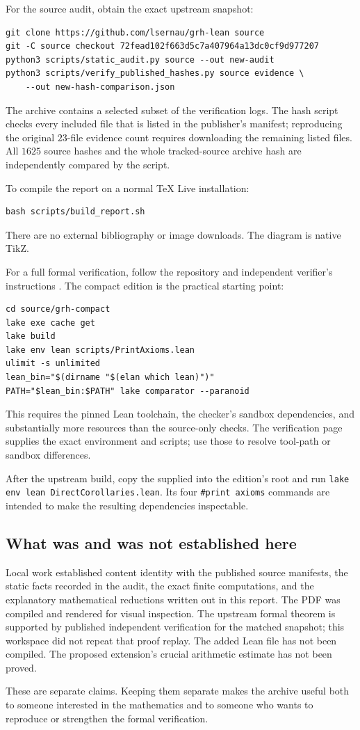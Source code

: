 For the source audit, obtain the exact upstream snapshot:
\begin{verbatim}
git clone https://github.com/lsernau/grh-lean source
git -C source checkout 72fead102f663d5c7a407964a13dc0cf9d977207
python3 scripts/static_audit.py source --out new-audit
python3 scripts/verify_published_hashes.py source evidence \
    --out new-hash-comparison.json
\end{verbatim}
The archive contains a selected subset of the verification logs. The hash script checks every included file that is listed in the publisher's manifest; reproducing the original \(23\)-file evidence count requires downloading the remaining listed files. All \(1625\) source hashes and the whole tracked-source archive hash are independently compared by the script.

To compile the report on a normal TeX Live installation:
\begin{verbatim}
bash scripts/build_report.sh
\end{verbatim}
There are no external bibliography or image downloads. The diagram is native TikZ.

For a full formal verification, follow the repository and independent verifier's instructions \cite{repo,checks}. The compact edition is the practical starting point:
\begin{verbatim}
cd source/grh-compact
lake exe cache get
lake build
lake env lean scripts/PrintAxioms.lean
ulimit -s unlimited
lean_bin="$(dirname "$(elan which lean)")"
PATH="$lean_bin:$PATH" lake comparator --paranoid
\end{verbatim}
This requires the pinned Lean toolchain, the checker's sandbox dependencies, and substantially more resources than the source-only checks. The verification page supplies the exact environment and scripts; use those to resolve tool-path or sandbox differences.

After the upstream build, copy the supplied  into the edition's root and run \texttt{lake env lean DirectCorollaries.lean}. Its four \texttt{\#print axioms} commands are intended to make the resulting dependencies inspectable.

\subsection{What was and was not established here}

Local work established content identity with the published source manifests, the static facts recorded in the audit, the exact finite computations, and the explanatory mathematical reductions written out in this report. The PDF was compiled and rendered for visual inspection. The upstream formal theorem is supported by published independent verification for the matched snapshot; this workspace did not repeat that proof replay. The added Lean file has not been compiled. The proposed extension's crucial arithmetic estimate has not been proved.

These are separate claims. Keeping them separate makes the archive useful both to someone interested in the mathematics and to someone who wants to reproduce or strengthen the formal verification.
